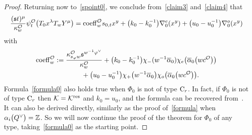 \begin{proof}
Returning now to~\eqref{spoint0},
we conclude from~\eqref{claim3} and~\eqref{claim4} that
\begin{equation}\label{formula0}
\frac{(\mathfrak{s}t)^\mu}{\kappa_w^\mathcal{O}}\psi_{t}^\mathcal{O}\bigl(T_0x^\lambda T_wY^\mu\bigr)
={\rm coeff}_w^\mathcal{O}s_{0,t}x^y+\bigl(k_0-k_0^{-1}\bigr)\nabla_0^e(x^y)+\bigl(u_0-u_0^{-1}\bigr)\nabla_0^o(x^y)
\end{equation}
with
\begin{gather}
{\rm coeff}_w^\mathcal{O}:=\frac{\kappa_{s_\varphi w}^\mathcal{O}\mathfrak{s}^{w^{-1}\varphi^\vee}}{\kappa_w^\mathcal{O}}+\bigl(k_0-k_0^{-1}\bigr)\chi_-(w^{-1}\overline{\alpha}_0)\chi_e \bigl(\overline{\alpha}_0\bigl(wc^\mathcal{O}\bigr)\bigr)\nonumber\\
\hphantom{{\rm coeff}_w^\mathcal{O}:=}{}
+\bigl(u_0-u_0^{-1}\bigr)\chi_+\bigl(w^{-1}\overline{\alpha}_0\bigr)\chi_o\bigl(\overline{\alpha}_0\bigl(wc^\mathcal{O}\bigr)\bigr).
\label{coeff}
\end{gather}
Formula~\eqref{formula0} also holds true when $\Phi_0$ is not of type ${\rm C}_r$. In fact, if $\Phi_0$ is not of type ${\rm C}_r$ then $\mathcal{K}=\mathcal{K}^{{\rm res}}$ and $k_0=u_0$,
and the formula can be recovered from~\cite[Section~5]{SSV2}. It can also be derived directly, similarly as the proof of~\eqref{formula} when $\alpha_i\smash{\bigl(Q^\vee\bigr)}=\mathbb{Z}$.
So we will now continue the proof of the theorem for $\Phi_0$ of any type, taking~\eqref{formula0} as the starting point.


\end{proof}
